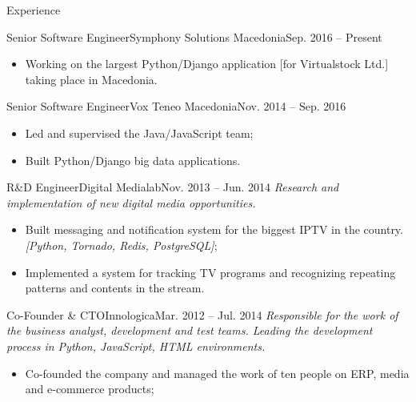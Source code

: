 \documentclass[]{mcdowellcv}
\begin{document}
    \begin{cvsection}{Experience}
    \label{Employment Record}
        \begin{cvsubsection}{Senior Software Engineer}{Symphony Solutions Macedonia}{Sep. 2016 -- Present}
             \begin{itemize}
                 \item Working on the largest Python/Django application [for Virtualstock Ltd.] taking place in Macedonia.
             \end{itemize}
        \end{cvsubsection}
        \begin{cvsubsection}{Senior Software Engineer}{Vox Teneo Macedonia}{Nov. 2014 -- Sep. 2016}
            \begin{itemize}
                \item Led and supervised the Java/JavaScript team;
                \item Built Python/Django big data applications.
            \end{itemize}
        \end{cvsubsection}
        \begin{cvsubsection}{R\&D Engineer}{Digital Medialab}{Nov. 2013 -- Jun. 2014}
            \textit{Research and implementation of new digital media opportunities.}
            \begin{itemize}
                \item Built messaging and notification system for the biggest IPTV in the country.
                    \textit{[Python, Tornado, Redis, PostgreSQL]};
                \item Implemented a system for tracking TV programs and recognizing repeating patterns and contents in the stream.
            \end{itemize}
        \end{cvsubsection}
        \begin{cvsubsection}{Co-Founder \& CTO}{Innologica}{Mar. 2012 -- Jul. 2014}
            \textit{Responsible for the work of the business analyst, development and test teams. Leading the development process in Python, JavaScript, HTML environments.}
            \begin{itemize}
                \item Co-founded the company and managed the work of ten people on ERP, media and e-commerce products;

\end{itemize}
\end{cvsubsection}
\end{cvsection}
\end{document}
